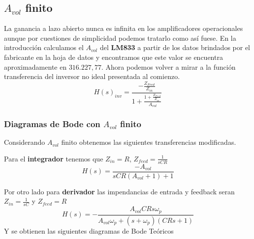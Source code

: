 \subsection{$A_{vol}$ finito}
La ganancia a lazo abierto nunca es infinita en los amplificadores operacionales aunque por cuestiones de simplicidad podemos tratarlo como así fuese. En la introducción calculamos el $A_{vol}$ del \textbf{LM833} a partir de los datos brindados por el fabricante en la hoja de datos y encontramos que este valor se encuentra aproximadamente en $316.227,77$.
Ahora podemos volver a mirar a la función transferencia del inversor no ideal presentada al comienzo.
$$H(s)_{inv} = \frac{-\frac{Z_{Feed}}{Z_{in}}}
{1+\frac{1+\frac{Z_{Feed}}{Z_{in}}}{A_{vol}}} $$


\subsubsection{Diagramas de Bode con $A_{vol}$ finito}
Considerando $A_{vol}$ finito obtenemos las siguientes transferencias modificadas.

Para el \textbf{integrador} tenemos que $Z_{in}=R$, $Z_{feed}=\frac{1}{sCR}$
$$H(s)=\frac{-A_{vol}}{sCR(A_{vol}+1)+1}$$

Por otro lado para \textbf{derivador} las impendancias de entrada y feedback seran $Z_{in} = \frac{1}{sC}$ y $Z_{feed}  = R$
$$H(s) = - \frac{A_{vol} C R s \omega_p}{A_{vol} \omega_p + \left(s + \omega_p\right) \left(C R s + 1\right)}$$
Y se obtienen las siguientes diagramas de Bode Teóricos 

